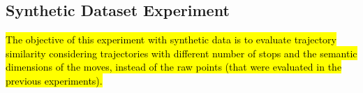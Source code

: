 \documentclass[12pt]{article}
\begin{document}


\subsection{Synthetic Dataset Experiment}\label{sec:hermoupolis}
\hl{The objective of this experiment with synthetic data is to evaluate trajectory similarity considering trajectories with different number of stops and the semantic dimensions of the moves, instead of the raw points (that were evaluated in the previous experiments).}
\end{document}
